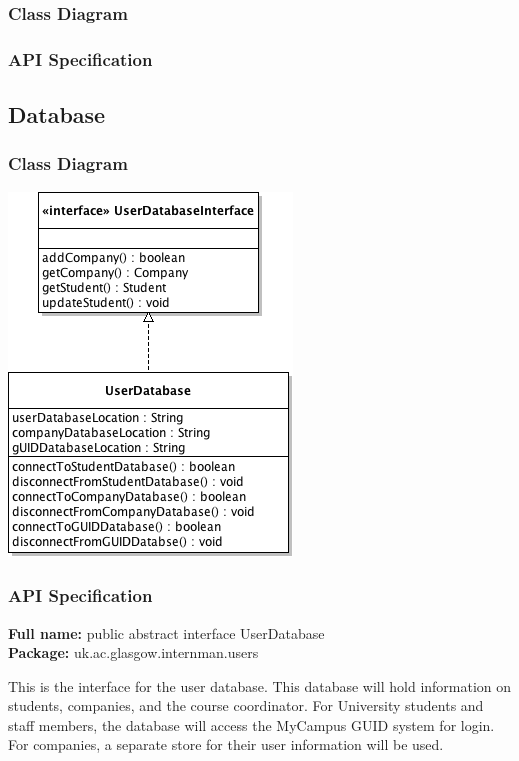 \documentclass[11pt]{article}
\begin{document}
\subsubsection{Class Diagram}

\subsubsection{API Specification}

\subsection{Database}

\subsubsection{Class Diagram}

\includegraphics{databaseClassDiagram.png}

\subsubsection{API Specification}

\textbf{Full name:} public abstract interface UserDatabase\\

\textbf{Package:} uk.ac.glasgow.internman.users

This is the interface for the user database. This database will hold information
on students, companies, and the course coordinator. For University students and
staff members, the database will access the MyCampus GUID system for login. For
companies, a separate store for their user information will be used.\\
\end{document}
